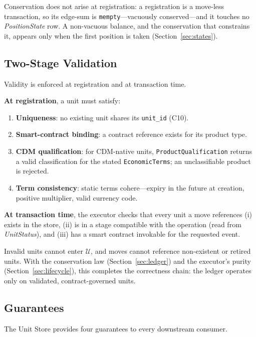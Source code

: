 \documentclass[11pt,a4paper]{article}
\begin{document}
Conservation does not arise at registration: a registration is a move-less transaction, so its edge-sum is \texttt{mempty}---vacuously conserved---and it touches no \emph{PositionState} row. A non-vacuous balance, and the conservation that constrains it, appears only when the first position is taken (Section~\ref{sec:states}).

\subsection{Two-Stage Validation}
\label{sec:unit-validation}

Validity is enforced at registration and at transaction time.

\noindent\textbf{At registration}, a unit must satisfy:
\begin{enumerate}[nosep]
\item \textbf{Uniqueness}: no existing unit shares its \texttt{unit\_id} (C10).
\item \textbf{Smart-contract binding}: a contract reference exists for its product type.
\item \textbf{CDM qualification}: for CDM-native units, \texttt{ProductQualification} returns a valid classification for the stated \texttt{EconomicTerms}; an unclassifiable product is rejected.
\item \textbf{Term consistency}: static terms cohere---expiry in the future at creation, positive multiplier, valid currency code.
\end{enumerate}

\noindent\textbf{At transaction time}, the executor checks that every unit a move references (i) exists in the store, (ii) is in a stage compatible with the operation (read from \emph{UnitStatus}), and (iii) has a smart contract invokable for the requested event.

Invalid units cannot enter $\mathcal{U}$, and moves cannot reference non-existent or retired units. With the conservation law (Section~\ref{sec:ledger}) and the executor's purity (Section~\ref{sec:lifecycle}), this completes the correctness chain: the ledger operates only on validated, contract-governed units.

\subsection{Guarantees}

The Unit Store provides four guarantees to every downstream consumer.
\end{document}
